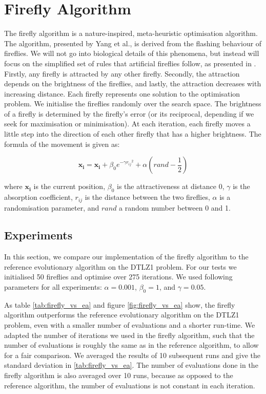 \section{Firefly Algorithm}

The firefly algorithm is a nature-inspired, meta-heuristic optimisation
algorithm. The algorithm, presented by Yang et al., is derived from the
flashing behaviour of fireflies. We will not go into biological details of this
phenomena, but instead will focus on the simplified set of rules that
artificial fireflies follow, as presented in \cite{firefly}. Firstly, any firefly
is attracted by any other firefly. Secondly, the attraction depends on the
brightness of the fireflies, and lastly, the attraction decreases with increasing
distance.  Each firefly represents one solution to the optimisation problem. We
initialise the fireflies randomly over the search space. The brightness of a
firefly is determined by the firefly's error (or its reciprocal, depending if
we seek for maximisation or minimisation). At each iteration, each firefly
moves a little step into the direction of each other firefly that has a higher
brightness. The formula of the movement is given as:

\begin{equation}
  \boldsymbol{x_i} = \boldsymbol{x_i} + \beta_0 e^{-\gamma {r_{ij}}^2} + \alpha (rand - \frac{1}{2})
\end{equation}

where $\boldsymbol{x_i}$ is the current position, $\beta_0$ is the attractiveness
at distance 0, $\gamma$ is the absorption coefficient, $r_{ij}$ is the distance
between the two fireflies, $\alpha$ is a randomisation parameter, and $rand$ a
random number between 0 and 1.

\subsection{Experiments}

In this section, we compare our implementation of the firefly algorithm to the
reference evolutionary algorithm on the DTLZ1 problem. For our tests we initialised 50 fireflies and
optimise over 275 iterations. We used following parameters for all experiments:
$\alpha = 0.001$, $\beta_0 = 1$, and $\gamma = 0.05$.


As table \cref{tab:firefly_vs_ea} and figure \cref{fig:firefly_vs_ea} show,
the firefly algorithm outperforms the reference evolutionary algorithm
on the DTLZ1 problem, even with a smaller number of evaluations and a shorter
run-time. We adapted the number of iterations we used in the firefly algorithm,
such that the number of evaluations is roughly the same as in the reference
algorithm, to allow for a fair comparison. We averaged the results of 10
subsequent runs and give the standard deviation in
\cref{tab:firefly_vs_ea}. The number of evaluations done in the firefly
algorithm is also averaged over 10 runs, because as opposed to the reference
algorithm, the number of evaluations is not constant in each iteration.

